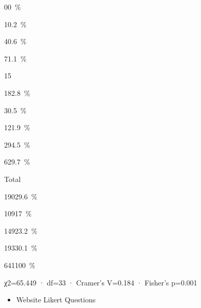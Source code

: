 \documentclass[
]{article}
\providecommand{\tightlist}{%
  \setlength{\itemsep}{0pt}\setlength{\parskip}{0pt}}
\begin{document}
{0}{0~\%}

{1}{0.2~\%}

{4}{0.6~\%}

{7}{1.1~\%}

15

{18}{2.8~\%}

{3}{0.5~\%}

{12}{1.9~\%}

{29}{4.5~\%}

{62}{9.7~\%}

Total

{190}{29.6~\%}

{109}{17~\%}

{149}{23.2~\%}

{193}{30.1~\%}

{641}{100~\%}

χ2=65.449 · df=33 · Cramer's V=0.184 · Fisher's p=0.001

\begin{itemize}
\tightlist
\item
  Website Likert Questions
\end{itemize}
\end{document}
